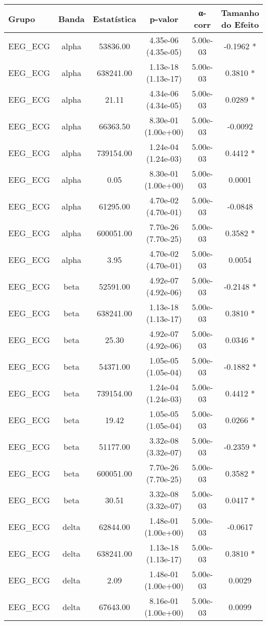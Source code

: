 \begin{tabular}{lccccc}
\toprule
Grupo & Banda & Estatística & p-valor & α-corr & Tamanho do Efeito \\
\midrule
EEG\_ECG & alpha & 53836.00 & 4.35e-06 (4.35e-05) & 5.00e-03 & -0.1962 * \\
EEG\_ECG & alpha & 638241.00 & 1.13e-18 (1.13e-17) & 5.00e-03 & 0.3810 * \\
EEG\_ECG & alpha & 21.11 & 4.34e-06 (4.34e-05) & 5.00e-03 & 0.0289 * \\
EEG\_ECG & alpha & 66363.50 & 8.30e-01 (1.00e+00) & 5.00e-03 & -0.0092  \\
EEG\_ECG & alpha & 739154.00 & 1.24e-04 (1.24e-03) & 5.00e-03 & 0.4412 * \\
EEG\_ECG & alpha & 0.05 & 8.30e-01 (1.00e+00) & 5.00e-03 & 0.0001  \\
EEG\_ECG & alpha & 61295.00 & 4.70e-02 (4.70e-01) & 5.00e-03 & -0.0848  \\
EEG\_ECG & alpha & 600051.00 & 7.70e-26 (7.70e-25) & 5.00e-03 & 0.3582 * \\
EEG\_ECG & alpha & 3.95 & 4.70e-02 (4.70e-01) & 5.00e-03 & 0.0054  \\
EEG\_ECG & beta & 52591.00 & 4.92e-07 (4.92e-06) & 5.00e-03 & -0.2148 * \\
EEG\_ECG & beta & 638241.00 & 1.13e-18 (1.13e-17) & 5.00e-03 & 0.3810 * \\
EEG\_ECG & beta & 25.30 & 4.92e-07 (4.92e-06) & 5.00e-03 & 0.0346 * \\
EEG\_ECG & beta & 54371.00 & 1.05e-05 (1.05e-04) & 5.00e-03 & -0.1882 * \\
EEG\_ECG & beta & 739154.00 & 1.24e-04 (1.24e-03) & 5.00e-03 & 0.4412 * \\
EEG\_ECG & beta & 19.42 & 1.05e-05 (1.05e-04) & 5.00e-03 & 0.0266 * \\
EEG\_ECG & beta & 51177.00 & 3.32e-08 (3.32e-07) & 5.00e-03 & -0.2359 * \\
EEG\_ECG & beta & 600051.00 & 7.70e-26 (7.70e-25) & 5.00e-03 & 0.3582 * \\
EEG\_ECG & beta & 30.51 & 3.32e-08 (3.32e-07) & 5.00e-03 & 0.0417 * \\
EEG\_ECG & delta & 62844.00 & 1.48e-01 (1.00e+00) & 5.00e-03 & -0.0617  \\
EEG\_ECG & delta & 638241.00 & 1.13e-18 (1.13e-17) & 5.00e-03 & 0.3810 * \\
EEG\_ECG & delta & 2.09 & 1.48e-01 (1.00e+00) & 5.00e-03 & 0.0029  \\
EEG\_ECG & delta & 67643.00 & 8.16e-01 (1.00e+00) & 5.00e-03 & 0.0099  \\

\end{tabular}

